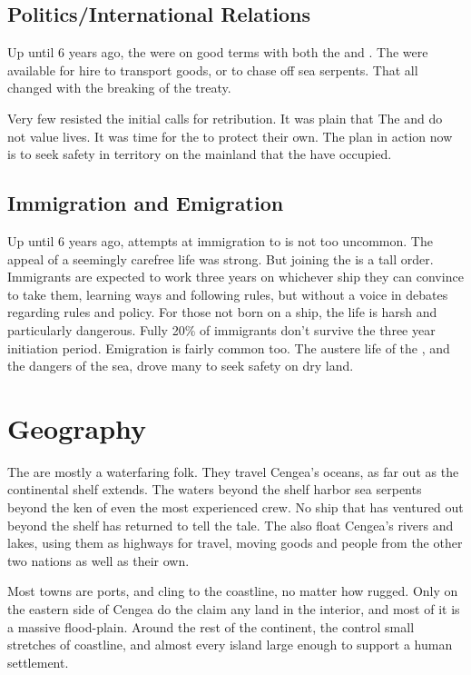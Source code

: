 \documentclass[blue]{GL2020}
\begin{document}
\subsection*{Politics/International Relations}
Up until 6 years ago, the \pShip{} were on good terms with both the \pFarm{} and \pTech{}. The \pShippies{} were available for hire to transport goods, or to chase off sea serpents. That all changed with the breaking of the treaty. 

Very few \pShippies{} resisted the initial calls for retribution. It was plain that The \pFarm{} and \pTech{} do not value \pShip{} lives. It was time for the \pShipppies{} to protect their own. The plan in action now is to seek safety in territory on the mainland that the \pShip{} have occupied.

\subsection*{Immigration and Emigration}
Up until 6 years ago, attempts at immigration to \pShip{} is not too uncommon. The appeal of a seemingly carefree life was strong. But joining the \pShippies{} is a tall order. Immigrants are expected to work three years on whichever ship they can convince to take them, learning \pShip{} ways and  following \pShip{} rules, but without a voice in debates regarding rules and policy. For those not born on a ship, the life is harsh and particularly dangerous. Fully 20\% of immigrants don't survive the three year initiation period. Emigration is fairly common too. The austere life of the \pShip{}, and the dangers of the sea, drove many to seek safety on dry land.

\section*{Geography}
The \pShip{} are mostly a waterfaring folk. They travel Cengea's oceans, as far out as the continental shelf extends. The waters beyond the shelf harbor sea serpents beyond the ken of even the most experienced \pShippies{} crew. No ship that has ventured out beyond the shelf has returned to tell the tale. The \pShippies{} also float Cengea's rivers and lakes, using them as highways for travel, moving goods and people from the other two nations as well as their own.

Most \pShip{} towns are ports, and cling to the coastline, no matter how rugged. Only on the eastern side of Cengea do the \pShippies{} claim any land in the interior, and most of it is a massive flood-plain. Around the rest of the continent, the \pShip{} control small stretches of coastline, and almost every island large enough to support a human settlement. 
\end{document}
